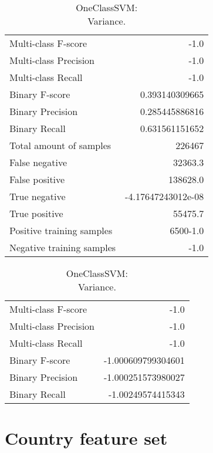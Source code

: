 \begin{table}[H]
\begin{minipage}{0.5\textwidth}

\caption{OneClassSVM: \\Average.}

\centering
\begin{tabular}{l r}
\toprule
Multi-class F-score & -1.0 \\
Multi-class Precision & -1.0 \\
Multi-class Recall & -1.0 \\
\midrule
Binary F-score & 0.393140309665 \\
Binary Precision & 0.285445886816 \\
Binary Recall & 0.631561151652 \\
\midrule
Total amount of samples & 226467 \\
False negative & 32363.3 \\
False positive & 138628.0 \\
True negative & -4.17647243012e-08 \\
True positive & 55475.7 \\
\midrule
Positive training samples & 6500-1.0 \\
Negative training samples & -1.0 \\
\bottomrule
\end{tabular}

\end{minipage}
\hfillx
\begin{minipage}{0.5\textwidth}
\caption{OneClassSVM: \\Variance.}

\centering
\begin{tabular}{l r}
\toprule
Multi-class F-score & -1.0 \\
Multi-class Precision & -1.0 \\
Multi-class Recall & -1.0 \\
\midrule
Binary F-score & -1.000609799304601 \\
Binary Precision & -1.000251573980027 \\
Binary Recall & -1.00249574415343 \\
\bottomrule
\end{tabular}
\end{minipage}
\end{table}


\newpage
\section{Country feature set}
